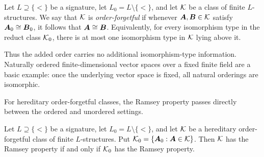 \begin{definition}
    \label{def:order-forgetful}
    Let \(L\supseteq\{<\}\) be a signature, let \(L_0=L\setminus\{<\}\), and let \(\mathcal{K}\) be a class of finite \(L\)-structures. We say that \(\mathcal{K}\) is \emph{order-forgetful} if whenever \(\boldsymbol{A},\boldsymbol{B}\in\mathcal{K}\) satisfy \(\boldsymbol{A}_0\cong \boldsymbol{B}_0\), it follows that \(\boldsymbol{A}\cong \boldsymbol{B}\).
    Equivalently, for every isomorphism type in the reduct class \(\mathcal{K}_0\), there is at most one isomorphism type in \(\mathcal{K}\) lying above it.
\end{definition}

Thus the added order carries no additional isomorphism-type information.
Naturally ordered finite-dimensional vector spaces over a fixed finite field
are a basic example: once the underlying vector space is fixed, all natural
orderings are isomorphic.

For hereditary order-forgetful classes, the Ramsey property passes directly between the ordered and unordered settings.

\begin{proposition}
    \label{prop:order-forgetful-ramsey}
    Let \(L\supseteq\{<\}\) be a signature, let \(L_0=L\setminus\{<\}\), and let \(\mathcal{K}\) be a hereditary order-forgetful class of finite \(L\)-structures. Put \(\mathcal{K}_0=\{\boldsymbol{A}_0 : \boldsymbol{A}\in\mathcal{K}\}\).
    Then \(\mathcal{K}\) has the Ramsey property if and only if \(\mathcal{K}_0\) has the Ramsey property.
\end{proposition}

